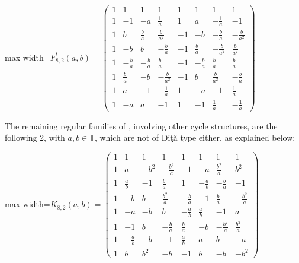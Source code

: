 \documentclass[11pt]{amsart}
\newcommand{\T}{\mathbb T}
\begin{document}
\begin{center}\normalsize\setlength{\arraycolsep}{3.8pt}
\begin{adjustbox}{max width=\textwidth}$\displaystyle F_{8,2}^{t}(a,b)=\begin{pmatrix}
1 & 1 & 1 & 1 & 1 & 1 & 1 & 1 \\
1 & -1 & -a & \frac{1}{a} & 1 & a & -\frac{1}{a} & -1 \\
1 & b & \frac{b}{a} & \frac{b}{a^{2}} & -1 & -b & -\frac{b}{a} & -\frac{b}{a^{2}} \\
1 & -b & b & -\frac{b}{a} & -1 & \frac{b}{a} & -\frac{b}{a^{2}} & \frac{b}{a^{2}} \\
1 & -\frac{b}{a} & -\frac{b}{a} & \frac{b}{a} & -1 & -\frac{b}{a} & \frac{b}{a} & \frac{b}{a} \\
1 & \frac{b}{a} & -b & -\frac{b}{a^{2}} & -1 & b & \frac{b}{a^{2}} & -\frac{b}{a} \\
1 & a & -1 & -\frac{1}{a} & 1 & -a & -1 & \frac{1}{a} \\
1 & -a & a & -1 & 1 & -1 & \frac{1}{a} & -\frac{1}{a}
\end{pmatrix}$\end{adjustbox}
\end{center}

\noindent The remaining regular families of \cite{gt}, involving other cycle structures, are the following 2, with $a,b\in\T$, which are not of Di\c t\u a type either, as explained below:

\begin{center}\normalsize\setlength{\arraycolsep}{3.8pt}
\begin{adjustbox}{max width=\textwidth}$\displaystyle K_{8,2}(a,b)=\begin{pmatrix}
1 & 1 & 1 & 1 & 1 & 1 & 1 & 1 \\
1 & a & -b^{2} & -\frac{b^{2}}{a} & -1 & -a & \frac{b^{2}}{a} & b^{2} \\
1 & \frac{a}{b} & -1 & \frac{b}{a} & 1 & -\frac{a}{b} & -\frac{b}{a} & -1 \\
1 & -b & b & \frac{b^{2}}{a} & -\frac{b}{a} & -1 & \frac{b}{a} & -\frac{b^{2}}{a} \\
1 & -a & -b & b & -\frac{a}{b} & \frac{a}{b} & -1 & a \\
1 & -1 & b & -\frac{b}{a} & \frac{b}{a} & -b & -\frac{b^{2}}{a} & \frac{b^{2}}{a} \\
1 & -\frac{a}{b} & -b & -1 & \frac{a}{b} & a & b & -a \\
1 & b & b^{2} & -b & -1 & b & -b & -b^{2}
\end{pmatrix}$\end{adjustbox}
\end{center}
\end{document}
